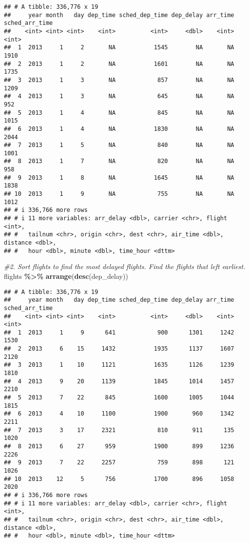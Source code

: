\documentclass[
]{article}
\newenvironment{Shaded}{\begin{snugshade}}{\end{snugshade}}
\newcommand{\CommentTok}[1]{\textcolor[rgb]{0.56,0.35,0.01}{\textit{#1}}}
\newcommand{\FunctionTok}[1]{\textcolor[rgb]{0.13,0.29,0.53}{\textbf{#1}}}
\newcommand{\NormalTok}[1]{#1}
\newcommand{\SpecialCharTok}[1]{\textcolor[rgb]{0.81,0.36,0.00}{\textbf{#1}}}
\begin{document}
\begin{verbatim}
## # A tibble: 336,776 x 19
##     year month   day dep_time sched_dep_time dep_delay arr_time sched_arr_time
##    <int> <int> <int>    <int>          <int>     <dbl>    <int>          <int>
##  1  2013     1     2       NA           1545        NA       NA           1910
##  2  2013     1     2       NA           1601        NA       NA           1735
##  3  2013     1     3       NA            857        NA       NA           1209
##  4  2013     1     3       NA            645        NA       NA            952
##  5  2013     1     4       NA            845        NA       NA           1015
##  6  2013     1     4       NA           1830        NA       NA           2044
##  7  2013     1     5       NA            840        NA       NA           1001
##  8  2013     1     7       NA            820        NA       NA            958
##  9  2013     1     8       NA           1645        NA       NA           1838
## 10  2013     1     9       NA            755        NA       NA           1012
## # i 336,766 more rows
## # i 11 more variables: arr_delay <dbl>, carrier <chr>, flight <int>,
## #   tailnum <chr>, origin <chr>, dest <chr>, air_time <dbl>, distance <dbl>,
## #   hour <dbl>, minute <dbl>, time_hour <dttm>
\end{verbatim}

\begin{Shaded}
\begin{Highlighting}[]
\CommentTok{\#2. Sort flights to find the most delayed flights. Find the flights that left earliest.}
\NormalTok{flights }\SpecialCharTok{\%\textgreater{}\%} 
    \FunctionTok{arrange}\NormalTok{(}\FunctionTok{desc}\NormalTok{(dep\_delay))}
\end{Highlighting}
\end{Shaded}

\begin{verbatim}
## # A tibble: 336,776 x 19
##     year month   day dep_time sched_dep_time dep_delay arr_time sched_arr_time
##    <int> <int> <int>    <int>          <int>     <dbl>    <int>          <int>
##  1  2013     1     9      641            900      1301     1242           1530
##  2  2013     6    15     1432           1935      1137     1607           2120
##  3  2013     1    10     1121           1635      1126     1239           1810
##  4  2013     9    20     1139           1845      1014     1457           2210
##  5  2013     7    22      845           1600      1005     1044           1815
##  6  2013     4    10     1100           1900       960     1342           2211
##  7  2013     3    17     2321            810       911      135           1020
##  8  2013     6    27      959           1900       899     1236           2226
##  9  2013     7    22     2257            759       898      121           1026
## 10  2013    12     5      756           1700       896     1058           2020
## # i 336,766 more rows
## # i 11 more variables: arr_delay <dbl>, carrier <chr>, flight <int>,
## #   tailnum <chr>, origin <chr>, dest <chr>, air_time <dbl>, distance <dbl>,
## #   hour <dbl>, minute <dbl>, time_hour <dttm>
\end{verbatim}
\end{document}
